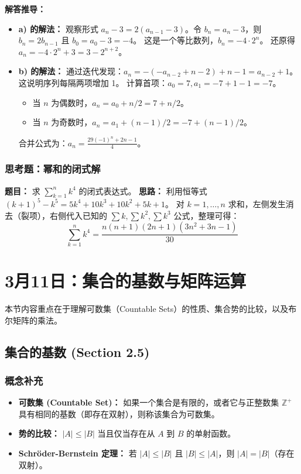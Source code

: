 \documentclass[11pt,UTF8]{article}
\begin{document}
\textbf{解答推导：}
\begin{itemize}
    \item \textbf{a) 的解法：}
    观察形式 $a_n - 3 = 2(a_{n-1} - 3)$。令 $b_n = a_n - 3$，则 $b_n = 2b_{n-1}$ 且 $b_0 = a_0 - 3 = -4$。
    这是一个等比数列，$b_n = -4 \cdot 2^n$。
    还原得 $a_n = -4 \cdot 2^n + 3 = 3 - 2^{n+2}$。

    \item \textbf{b) 的解法：}
    通过迭代发现：$a_n = -(-a_{n-2} + n - 2) + n - 1 = a_{n-2} + 1$。
    这说明序列每隔两项增加 1。
    计算首项：$a_0 = 7, a_1 = -7 + 1 - 1 = -7$。
    \begin{itemize}
        \item 当 $n$ 为偶数时，$a_n = a_0 + n/2 = 7 + n/2$。
        \item 当 $n$ 为奇数时，$a_n = a_1 + (n-1)/2 = -7 + (n-1)/2$。
    \end{itemize}
    合并公式为：$a_n = \frac{29(-1)^n + 2n - 1}{4}$。
\end{itemize}

\subsubsection*{思考题：幂和的闭式解}
\textbf{题目：} 求 $\sum_{k=1}^{n} k^4$ 的闭式表达式。
\textbf{思路：} 利用恒等式 $(k+1)^5 - k^5 = 5k^4 + 10k^3 + 10k^2 + 5k + 1$。
对 $k=1, \dots, n$ 求和，左侧发生消去（裂项），右侧代入已知的 $\sum k, \sum k^2, \sum k^3$ 公式，整理可得：
\[ \sum_{k=1}^{n} k^4 = \frac{n(n+1)(2n+1)(3n^2 + 3n - 1)}{30} \]



\section{3月11日：集合的基数与矩阵运算}

本节内容重点在于理解可数集（Countable Sets）的性质、集合势的比较，以及布尔矩阵的乘法。

\subsection{集合的基数 (Section 2.5)}

\subsubsection*{概念补充}
\begin{itemize}
    \item \textbf{可数集 (Countable Set)：} 如果一个集合是有限的，或者它与正整数集 $\mathbb{Z}^+$ 具有相同的基数（即存在双射），则称该集合为可数集。
    \item \textbf{势的比较：} $|A| \le |B|$ 当且仅当存在从 $A$ 到 $B$ 的单射函数。
    \item \textbf{Schröder-Bernstein 定理：} 若 $|A| \le |B|$ 且 $|B| \le |A|$，则 $|A| = |B|$（存在双射）。
\end{itemize}
\end{document}
